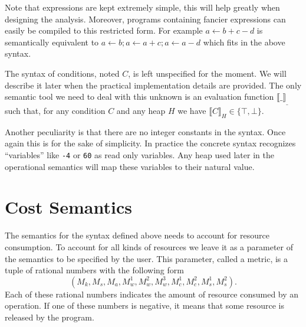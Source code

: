 \documentclass[nocopyrightspace,preprint]{sigplanconf}
\begin{document}
Note that expressions are kept extremely simple, this will help
greatly when designing the analysis.  Moreover, programs
containing fancier expressions can easily be compiled to this
restricted form.  For example $a \gets b + c - d$ is semantically
equivalent to $a \gets b; a \gets a + c; a \gets a - d$ which
fits in the above syntax.

The syntax of conditions, noted $C$, is left unspecified
for the moment.  We will describe it later when the practical
implementation details are provided.  The only semantic tool
we need to deal with this unknown is an evaluation
function $\llbracket \_ \rrbracket_{\_}$ such that, for any
condition $C$ and any heap $H$ we have $\llbracket
C \rrbracket_H \in \{ \top, \bot \}$.

Another peculiarity is that there are no integer constants in the
syntax.  Once again this is for the sake of simplicity.  In practice
the concrete syntax recognizes ``variables'' like {\tt -4} or
{\tt 60} as read only variables.  Any heap used later in the
operational semantics will map these variables to their natural
value.

\section{Cost Semantics}

The semantics for the syntax defined above needs to account
for resource consumption.  To account for all kinds of resources
we leave it as a parameter of the semantics to be specified
by the user.  This parameter, called a metric, is a tuple of rational
numbers with the following form
$$
(
M_k, M_s, M_a,
M_w^1, M_w^2, M_w^3,
M_c^1, M_c^2,
M_s^1, M_s^2
).
$$
Each of these rational numbers indicates the amount of resource
consumed by an operation.  If one of these numbers is negative,
it means that some resource is released by the program.
\end{document}
